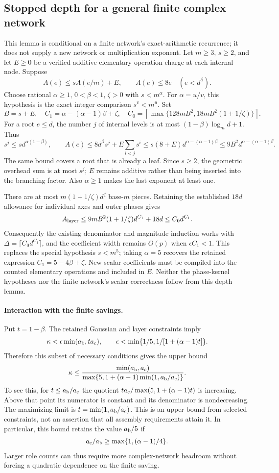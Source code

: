 \subsection{Stopped depth for a general finite complex network}
\label{sec:general-network-stopped-depth}
This lemma is conditional on a finite network's exact-arithmetic recurrence;
it does not supply a new network or multiplication exponent.
Let $m\ge3$, $s\ge2$, and let $E\ge0$ be a verified additive elementary-operation
charge at each internal node. Suppose
\[
 A(e)\le sA(e/m)+E,\qquad A(e)\le8e\quad(e<d^\beta).
\]
Choose rational $\alpha\ge1$, $0<\beta<1$, $\zeta>0$ with $s<m^\alpha$.
For $\alpha=u/v$, this hypothesis is the exact integer comparison $s^v<m^u$.
Set
\[
 B=s+E,\quad C_1=\alpha-(\alpha-1)\beta+\zeta,
\quad C_0=\left\lceil\max\{128mB^2,18mB^2(1+1/\zeta)\}\right\rceil.
\]
For a root $e\le d$, the number $j$ of internal levels is at most
$(1-\beta)\log_m d+1$. Thus
\[
 s^j\le s d^{\alpha(1-\beta)},\qquad
 A(e)\le8d^\beta s^j+E\sum_{i<j}s^i
 \le s(8+E)d^{\alpha-(\alpha-1)\beta}
 \le9B^2d^{\alpha-(\alpha-1)\beta}.
\]
The same bound covers a root that is already a leaf. Since $s\ge2$, the
geometric overhead sum is at most $s^j$; $E$ remains additive rather than
being inserted into the branching factor. Also $\alpha\ge1$ makes the last
exponent at least one.

There are at most $m(1+1/\zeta)d^\zeta$ base-$m$ pieces. Retaining the
established $18d$ allowance for individual axes and outer phases gives
\[
 A_{\rm layer}\le9mB^2(1+1/\zeta)d^{C_1}+18d
 \le C_0d^{C_1}.
\]
Consequently the existing denominator and magnitude induction works with
$\Delta=\lceil C_0d^{C_1}\rceil$, and the coefficient width remains $O(p)$
when $\epsilon C_1<1$. This replaces the special hypothesis $s<m^5$;
taking $\alpha=5$ recovers the retained expression $C_1=5-4\beta+\zeta$.
New scalar coefficients must be compiled into the counted elementary
operations and included in $E$. Neither the phase-kernel hypotheses nor the
finite network's scalar correctness follow from this depth lemma.

\paragraph{Interaction with the finite savings.}
Put $t=1-\beta$. The retained Gaussian and layer constraints imply
\[
 \kappa<\epsilon\min(a_{\rm b},ta_{\rm c}),\qquad
 \epsilon<\min\{1/5,1/[1+(\alpha-1)t]\}.
\]
Therefore this subset of necessary conditions gives the upper bound
\[
 \kappa\le
 \frac{\min(a_{\rm b},a_{\rm c})}
 {\max\{5,1+(\alpha-1)\min(1,a_{\rm b}/a_{\rm c})\}}.
\]
To see this, for $t\le a_{\rm b}/a_{\rm c}$ the quotient
$ta_{\rm c}/\max(5,1+(\alpha-1)t)$ is increasing. Above that point its
numerator is constant and its denominator is nondecreasing. The maximizing
limit is $t=\min(1,a_{\rm b}/a_{\rm c})$. This is an upper bound from selected
constraints, not an assertion that all assembly requirements attain it.
In particular, this bound retains the value $a_{\rm b}/5$ if
\[
 a_{\rm c}/a_{\rm b}\ge\max\{1,(\alpha-1)/4\}.
\]
Larger role counts can thus require more complex-network headroom without
forcing a quadratic dependence on the finite saving.
